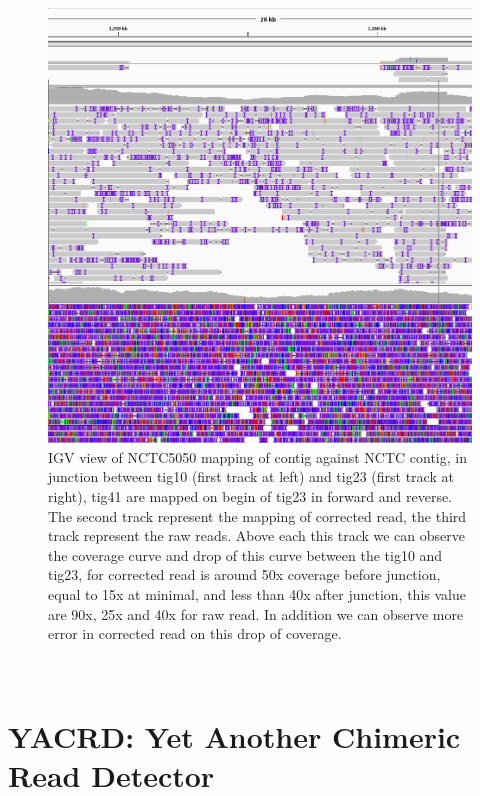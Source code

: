 \documentclass[./main.tex]{subfiles}
\begin{document}
\begin{figure}[!htbp]
    \centering
    \includegraphics[width=\textwidth]{supplemental/knot/NCTC5050_tig10_tig23.png}
    \caption{IGV view of NCTC5050 mapping of \canu contig against NCTC contig, in junction between tig10 (first track at left) and tig23 (first track at right), tig41 are mapped on begin of tig23 in forward and reverse. The second track represent the mapping of \canu corrected read, the third track represent the raw reads. Above each this track we can observe the coverage curve and drop of this curve between the tig10 and tig23, for corrected read is around 50x coverage before junction, equal to 15x at minimal, and less than 40x after junction, this value are 90x, 25x and 40x for raw read. In addition we can observe more error in corrected read on this drop of coverage.}
    \label{fig:appendix:NCTC5050_tig10_tig23}
\end{figure}

\newpage

~

\section{YACRD: Yet Another Chimeric Read Detector}
\end{document}
